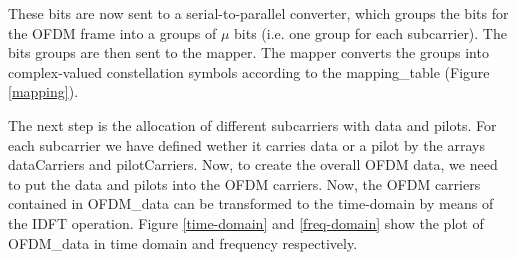 These bits are now sent to a serial-to-parallel converter, which groups the bits for the OFDM frame into a groups of $\mu$ bits (i.e. one group for each subcarrier). The bits groups are then sent to the mapper. The mapper converts the groups into complex-valued constellation symbols according to the mapping\_table (Figure \ref{mapping}).

The next step is the allocation of different subcarriers with data and pilots. For each subcarrier we have defined wether it carries data or a pilot by the arrays dataCarriers and pilotCarriers. Now, to create the overall OFDM data, we need to put the data and pilots into the OFDM carriers. Now, the OFDM carriers contained in OFDM\_data can be transformed to the time-domain by means of the IDFT operation. Figure \ref{time-domain} and \ref{freq-domain} show the plot of OFDM\_data in time domain and frequency respectively.

